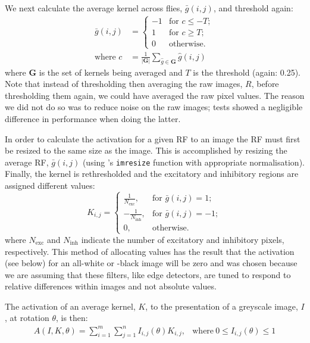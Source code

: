 We next calculate the average kernel across flies, $\bar{g}(i,j)$, and threshold again:
\begin{align*}
\bar{g}(i,j) &= \left\{ \begin{array}{rl}
-1 & \mbox{for } c \le -T; \\
1 & \mbox{for } c \ge T; \\
0 & \mbox{otherwise.} 
\end{array} \right. \\
\mbox{where } c &= \frac{1}{|\mathbf{G}|}\sum\limits_{\hat{g} \in \mathbf{G}} \hat{g}(i,j)
\end{align*}
where $\mathbf{G}$ is the set of kernels being averaged and $T$ is the threshold (again: 0.25). Note that instead of thresholding then averaging the raw images, $R$, before thresholding them again, we could have averaged the raw pixel values. The reason we did not do so was to reduce noise on the raw images; tests showed a negligible difference in performance when doing the latter.

In order to calculate the activation for a given \ac{RF} to an image the \ac{RF} must first be resized to the same size as the image.
This is accomplished by resizing the average \ac{RF}, $\bar{g}(i,j)$ (using \Matlab's \texttt{imresize} function with appropriate normalisation).
Finally, the kernel is rethresholded and the excitatory and inhibitory regions are assigned different values:
$$
K_{i,j} = \left\{
\begin{array}{rl}
\frac{1}{N_\mathrm{exc}}, & \mbox{for } \bar{g}(i,j) = 1; \\
-\frac{1}{N_\mathrm{inh}}, & \mbox{for } \bar{g}(i,j) = -1; \\
0, & \mbox{otherwise.}
\end{array}
\right.
$$
where $N_\mathrm{exc}$ and $N_\mathrm{inh}$ indicate the number of excitatory and inhibitory pixels, respectively.
This method of allocating values has the result that the activation (see below) for an all-white or -black image will be zero and was chosen because we are assuming that these filters, like edge detectors, are tuned to respond to relative differences within images and not absolute values.

The activation of an average kernel, $K$, to the presentation of a greyscale image, $I$, at rotation $\theta$, is then:
\begin{equation}
\label{eq:act}
\begin{array}{rl}
A(I,K,\theta) = {\sum\limits^m_{i=1} \sum\limits^n_{j=1} I_{i,j}(\theta)K_{i,j}}, &\mathrm{where\ } 0 \le I_{i,j}(\theta) \le 1
\end{array}
\end{equation}


